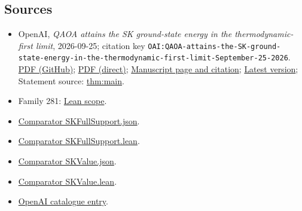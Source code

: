 \documentclass[11pt]{article}
\begin{document}
\subsection{Sources}
\begin{itemize}
\item OpenAI, \emph{QAOA attains the SK ground-state energy in the thermodynamic-first limit}, 2026-09-25; citation key \texttt{OAI:QAOA-attains-the-SK-ground-state-energy-in-the-thermodynamic-first-limit-September-25-2026}. \href{https://github.com/openai/math/blob/adc7f1241b42e322a6451854ab7e4b4c146bf78a/preprints/QAOA-attains-the-SK-ground-state-energy-in-the-thermodynamic-first-limit-September-25-2026/QAOA-attains-the-SK-ground-state-energy-in-the-thermodynamic-first-limit-September-25-2026.pdf}{PDF (GitHub)}; \href{https://github.com/openai/math/raw/adc7f1241b42e322a6451854ab7e4b4c146bf78a/preprints/QAOA-attains-the-SK-ground-state-energy-in-the-thermodynamic-first-limit-September-25-2026/QAOA-attains-the-SK-ground-state-energy-in-the-thermodynamic-first-limit-September-25-2026.pdf}{PDF (direct)}; \href{https://github.com/openai/math/blob/adc7f1241b42e322a6451854ab7e4b4c146bf78a/preprints/QAOA-attains-the-SK-ground-state-energy-in-the-thermodynamic-first-limit-September-25-2026/README.md}{Manuscript page and citation}; \href{https://github.com/openai/math/blob/main/preprints/QAOA-attains-the-SK-ground-state-energy-in-the-thermodynamic-first-limit-September-25-2026/QAOA-attains-the-SK-ground-state-energy-in-the-thermodynamic-first-limit-September-25-2026.pdf}{Latest version}; Statement source: \href{https://github.com/openai/math/blob/adc7f1241b42e322a6451854ab7e4b4c146bf78a/preprints/QAOA-attains-the-SK-ground-state-energy-in-the-thermodynamic-first-limit-September-25-2026/build/sections/01-introduction.tex\#L111}{thm:main}.
\item Family 281: \href{https://github.com/openai/math/blob/adc7f1241b42e322a6451854ab7e4b4c146bf78a/lean/docs/281.md}{Lean scope}.
\item \href{https://github.com/openai/math/blob/adc7f1241b42e322a6451854ab7e4b4c146bf78a/lean/ComparatorChallenges/SKFullSupport.json}{Comparator SKFullSupport.json}.
\item \href{https://github.com/openai/math/blob/adc7f1241b42e322a6451854ab7e4b4c146bf78a/lean/ComparatorChallenges/SKFullSupport.lean}{Comparator SKFullSupport.lean}.
\item \href{https://github.com/openai/math/blob/adc7f1241b42e322a6451854ab7e4b4c146bf78a/lean/ComparatorChallenges/SKValue.json}{Comparator SKValue.json}.
\item \href{https://github.com/openai/math/blob/adc7f1241b42e322a6451854ab7e4b4c146bf78a/lean/ComparatorChallenges/SKValue.lean}{Comparator SKValue.lean}.
\item \href{https://github.com/openai/math/blob/adc7f1241b42e322a6451854ab7e4b4c146bf78a/CONTENTS.md}{OpenAI catalogue entry}.
\end{itemize}
\end{document}
